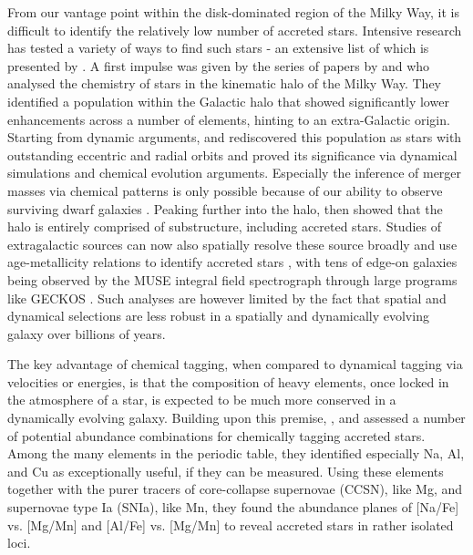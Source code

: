 \documentclass[fleqn,usenatbib]{mnras}
\begin{document}
From our vantage point within the disk-dominated region of the Milky Way, it is difficult to identify the relatively low number of accreted stars. Intensive research has tested a variety of ways to find such stars - an extensive list of which is presented by \citet{Buder2022}. A first impulse was given by the series of papers by \citet{Nissen2010, Nissen2011, Nissen2014} and \citet{Schuster2012} who analysed the chemistry of stars in the kinematic halo of the Milky Way. They identified a population within the Galactic halo that showed significantly lower enhancements across a number of elements, hinting to an extra-Galactic origin. Starting from dynamic arguments, \citet{Belokurov2018} and \citet{Helmi2018} rediscovered this population as stars with outstanding eccentric and radial orbits and proved its significance via dynamical simulations and chemical evolution arguments. Especially the inference of merger masses via chemical patterns is only possible because of our ability to observe surviving dwarf galaxies \citep{Tolstoy2009, Helmi2018, Hasselquist2021, Carrillo2022}. Peaking further into the halo, \citet{Naidu2020} then showed that the halo is entirely comprised of substructure, including accreted stars. Studies of extragalactic sources can now also spatially resolve these source broadly and use age-metallicity relations to identify accreted stars \citep{Martig2021}, with tens of edge-on galaxies being observed by the MUSE integral field spectrograph through large programs like GECKOS \citep{GECKOS2023}. Such analyses are however limited by the fact that spatial and dynamical selections are less robust in a spatially and dynamically evolving galaxy over billions of years.

The key advantage of chemical tagging, when compared to dynamical tagging via velocities or energies, is that the composition of heavy elements, once locked in the atmosphere of a star, is expected to be much more conserved in a dynamically evolving galaxy. Building upon this premise, \citet{Hawkins2015}, \citet{Das2020} and \citet{Buder2022} assessed a number of potential abundance combinations for chemically tagging accreted stars. Among the many elements in the periodic table, they identified especially Na, Al, and Cu as exceptionally useful, if they can be measured. Using these elements together with the purer tracers of core-collapse supernovae (CCSN), like Mg, and supernovae type Ia (SNIa), like Mn, they found the abundance planes of [Na/Fe] vs. [Mg/Mn] and [Al/Fe] vs. [Mg/Mn] to reveal accreted stars in rather isolated loci.
\end{document}
